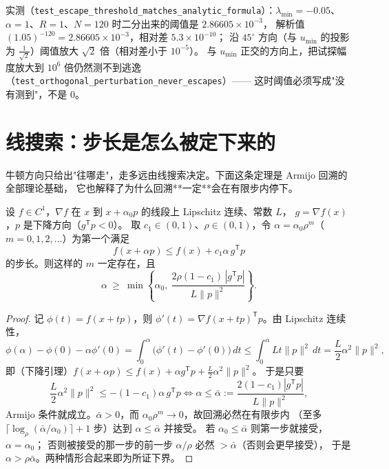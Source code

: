 实测（\texttt{test\_escape\_threshold\_matches\_analytic\_formula}）：$\lambda_{\min}=-0.05$、
$\alpha=1$、$R=1$、$N=120$ 时二分出来的阈值是 $2.86605\times10^{-3}$，
解析值 $(1.05)^{-120}=2.86605\times10^{-3}$，相对差 $5.3\times10^{-10}$；
沿 $45^\circ$ 方向（与 $u_{\min}$ 的投影为 $\tfrac1{\sqrt2}$）阈值放大
$\sqrt2$ 倍（相对差小于 $10^{-5}$）。
与 $u_{\min}$ 正交的方向上，把试探幅度放大到 $10^{6}$ 倍仍然测不到逃逸
（\texttt{test\_orthogonal\_perturbation\_never\_escapes}）——
这时阈值必须写成"没有测到"，不是 $0$。

\section{线搜索：步长是怎么被定下来的}

牛顿方向只给出"往哪走"，走多远由线搜索决定。下面这条定理是 Armijo 回溯的全部理论基础，
它也解释了为什么回溯**一定**会在有限步内停下。

\begin{theorem}
\label{thm:armijo}
设 $f\in C^1$，$\nabla f$ 在 $x$ 到 $x+\alpha_0p$ 的线段上 Lipschitz 连续、常数 $L$，
$g=\nabla f(x)$，$p$ 是下降方向（$g^{\mathsf T}p<0$）。
取 $c_1\in(0,1)$、$\rho\in(0,1)$，令 $\alpha=\alpha_0\rho^m$（$m=0,1,2,\dots$）为第一个满足
\[
  f(x+\alpha p)\le f(x)+c_1\alpha\,g^{\mathsf T}p
\]
的步长。则这样的 $m$ 一定存在，且
\[
  \alpha\ \ge\ \min\left\{\alpha_0,\ \frac{2\rho(1-c_1)\,|g^{\mathsf T}p|}{L\|p\|^2}\right\}.
\]
\end{theorem}

\begin{proof}
记 $\phi(t)=f(x+tp)$，则 $\phi'(t)=\nabla f(x+tp)^{\mathsf T}p$。由 Lipschitz 连续性，
\[
  \phi(\alpha)-\phi(0)-\alpha\phi'(0)=\int_0^\alpha\bigl(\phi'(t)-\phi'(0)\bigr)\,dt
  \le\int_0^\alpha Lt\|p\|^2\,dt=\frac L2\alpha^2\|p\|^2 ,
\]
即（下降引理）$f(x+\alpha p)\le f(x)+\alpha g^{\mathsf T}p+\frac L2\alpha^2\|p\|^2$。
于是只要
\[
  \frac L2\alpha^2\|p\|^2\le -(1-c_1)\alpha\,g^{\mathsf T}p
  \iff \alpha\le\bar\alpha:=\frac{2(1-c_1)|g^{\mathsf T}p|}{L\|p\|^2},
\]
Armijo 条件就成立。$\bar\alpha>0$，而 $\alpha_0\rho^m\to0$，故回溯必然在有限步内
（至多 $\lceil\log_\rho(\bar\alpha/\alpha_0)\rceil+1$ 步）达到 $\alpha\le\bar\alpha$ 并接受。
若 $\alpha_0\le\bar\alpha$ 则第一步就接受，$\alpha=\alpha_0$；
否则被接受的那一步的前一步 $\alpha/\rho$ 必然 $>\bar\alpha$（否则会更早接受），
于是 $\alpha>\rho\bar\alpha$。两种情形合起来即为所证下界。
\end{proof}

